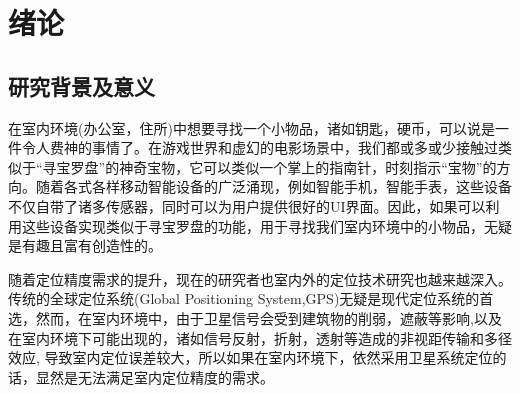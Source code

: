 \documentclass[winfonts,oneside]{njuthesis}
\begin{document}
%
%
%
%

\tableofcontents

\listoffigures

\listoftables

\mainmatter

\chapter{绪论}\label{chapter_introduction}
	\section{研究背景及意义}
	
		在室内环境(办公室，住所)中想要寻找一个小物品，诸如钥匙，硬币，可以说是一件令人费神的事情了\cite{HyperEarAbstract}。在游戏世界和虚幻的电影场景中，我们都或多或少接触过类似于“寻宝罗盘”的神奇宝物，它可以类似一个掌上的指南针，时刻指示“宝物”的方向。随着各式各样移动智能设备的广泛涌现，例如智能手机，智能手表，这些设备不仅自带了诸多传感器，同时可以为用户提供很好的UI界面。因此，如果可以利用这些设备实现类似于寻宝罗盘的功能，用于寻找我们室内环境中的小物品，无疑是有趣且富有创造性的。
		
		随着定位精度需求的提升，现在的研究者也室内外的定位技术研究也越来越深入。传统的全球定位系统(Global Positioning System,GPS)\cite{wikipedia_GPS}无疑是现代定位系统的首选，然而，在室内环境中，由于卫星信号会受到建筑物的削弱，遮蔽等影响,以及在室内环境下可能出现的，诸如信号反射，折射，透射等造成的非视距传输和多径效应, 导致室内定位误差较大，所以如果在室内环境下，依然采用卫星系统定位的话，显然是无法满足室内定位精度的需求。
		
\end{document}
